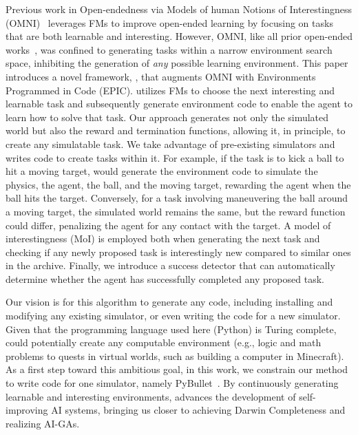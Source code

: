 \documentclass{article} %
\begin{document}
Previous work in Open-endedness via Models of human Notions of Interestingness (OMNI)~\citep{zhang_OMNIOpenendednessModels_2023} leverages FMs to improve open-ended learning by focusing on tasks that are both learnable and interesting. However, OMNI, like all prior open-ended works~\citep{sudhakaran_MarioGPTOpenEndedText2Level_2023,wang_PairedOpenEndedTrailblazer_2019,wang_EnhancedPOETOpenended_2020,zhang_OMNIOpenendednessModels_2023,wang2023voyager}, was confined to generating tasks within a narrow environment search space, inhibiting the generation of \emph{any} possible learning environment. This paper introduces a novel framework, \ours{}, that augments OMNI with Environments Programmed in Code (EPIC). \ours{} utilizes FMs to choose the next interesting and learnable task and subsequently generate environment code to enable the agent to learn how to solve that task. Our approach generates not only the simulated world but also the reward and termination functions, allowing it, in principle, to create any simulatable task. We take advantage of pre-existing simulators and \ours{} writes code to create tasks within it. For example, if the task is to kick a ball to hit a moving target, \ours{} would generate the environment code to simulate the physics, the agent, the ball, and the moving target, rewarding the agent when the ball hits the target. Conversely, for a task involving maneuvering the ball around a moving target, the simulated world remains the same, but the reward function could differ, penalizing the agent for any contact with the target. A model of interestingness (MoI) is employed both when generating the next task and checking if any newly proposed task is interestingly new compared to similar ones in the archive. Finally, we introduce a success detector that can automatically determine whether the agent has successfully completed any proposed task.

Our vision is for this algorithm to generate any code, including installing and modifying any existing simulator, or even writing the code for a new simulator. Given that the programming language used here (Python) is Turing complete, \ours{} could potentially create any computable environment (e.g., logic and math problems to quests in virtual worlds, such as building a computer in Minecraft). As a first step toward this ambitious goal, in this work, we constrain our method to write code for one simulator, namely PyBullet~\citep{coumans2016pybullet}. By continuously generating learnable and interesting environments, \ours{} advances the development of self-improving AI systems, bringing us closer to achieving Darwin Completeness and realizing AI-GAs.
\end{document}
